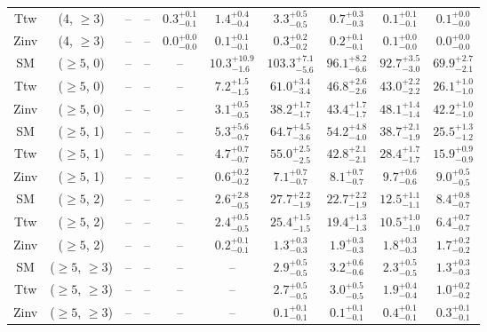 \begin{table}[h!]
{\begin{tabular}{cccccccccc}
	Ttw & (4, $\ge3$) & -- & -- & $0.3^{+ 0.1 }_{- 0.1 }$ & $1.4^{+ 0.4 }_{- 0.4 }$ & $3.3^{+ 0.5 }_{- 0.5 }$ & $0.7^{+ 0.3 }_{- 0.3 }$ & $0.1^{+ 0.1 }_{- 0.1 }$ & $0.1^{+ 0.0 }_{- 0.0 }$ \\[0.5ex] 
	Zinv & (4, $\ge3$) & -- & -- & $0.0^{+ 0.0 }_{- 0.0 }$ & $0.1^{+ 0.1 }_{- 0.1 }$ & $0.3^{+ 0.2 }_{- 0.2 }$ & $0.2^{+ 0.1 }_{- 0.1 }$ & $0.1^{+ 0.0 }_{- 0.0 }$ & $0.0^{+ 0.0 }_{- 0.0 }$ \\[0.5ex] 
	SM & ($\ge5$, 0) & -- & -- & -- & $10.3^{+ 10.9 }_{- 1.6 }$ & $103.3^{+ 7.1 }_{- 5.6 }$ & $96.1^{+ 8.2 }_{- 6.6 }$ & $92.7^{+ 3.5 }_{- 3.0 }$ & $69.9^{+ 2.7 }_{- 2.1 }$ \\[0.5ex] 
	Ttw & ($\ge5$, 0) & -- & -- & -- & $7.2^{+ 1.5 }_{- 1.5 }$ & $61.0^{+ 3.4 }_{- 3.4 }$ & $46.8^{+ 2.6 }_{- 2.6 }$ & $43.0^{+ 2.2 }_{- 2.2 }$ & $26.1^{+ 1.0 }_{- 1.0 }$ \\[0.5ex] 
	Zinv & ($\ge5$, 0) & -- & -- & -- & $3.1^{+ 0.5 }_{- 0.5 }$ & $38.2^{+ 1.7 }_{- 1.7 }$ & $43.4^{+ 1.7 }_{- 1.7 }$ & $48.1^{+ 1.4 }_{- 1.4 }$ & $42.2^{+ 1.0 }_{- 1.0 }$ \\[0.5ex] 
	SM & ($\ge5$, 1) & -- & -- & -- & $5.3^{+ 5.6 }_{- 0.7 }$ & $64.7^{+ 4.5 }_{- 3.6 }$ & $54.2^{+ 4.8 }_{- 4.0 }$ & $38.7^{+ 2.1 }_{- 1.9 }$ & $25.5^{+ 1.3 }_{- 1.2 }$ \\[0.5ex] 
	Ttw & ($\ge5$, 1) & -- & -- & -- & $4.7^{+ 0.7 }_{- 0.7 }$ & $55.0^{+ 2.5 }_{- 2.5 }$ & $42.8^{+ 2.1 }_{- 2.1 }$ & $28.4^{+ 1.7 }_{- 1.7 }$ & $15.9^{+ 0.9 }_{- 0.9 }$ \\[0.5ex] 
	Zinv & ($\ge5$, 1) & -- & -- & -- & $0.6^{+ 0.2 }_{- 0.2 }$ & $7.1^{+ 0.7 }_{- 0.7 }$ & $8.1^{+ 0.7 }_{- 0.7 }$ & $9.7^{+ 0.6 }_{- 0.6 }$ & $9.0^{+ 0.5 }_{- 0.5 }$ \\[0.5ex] 
	SM & ($\ge5$, 2) & -- & -- & -- & $2.6^{+ 2.8 }_{- 0.5 }$ & $27.7^{+ 2.2 }_{- 1.9 }$ & $22.7^{+ 2.2 }_{- 1.9 }$ & $12.5^{+ 1.1 }_{- 1.1 }$ & $8.4^{+ 0.8 }_{- 0.7 }$ \\[0.5ex] 
	Ttw & ($\ge5$, 2) & -- & -- & -- & $2.4^{+ 0.5 }_{- 0.5 }$ & $25.4^{+ 1.5 }_{- 1.5 }$ & $19.4^{+ 1.3 }_{- 1.3 }$ & $10.5^{+ 1.0 }_{- 1.0 }$ & $6.4^{+ 0.7 }_{- 0.7 }$ \\[0.5ex] 
	Zinv & ($\ge5$, 2) & -- & -- & -- & $0.2^{+ 0.1 }_{- 0.1 }$ & $1.3^{+ 0.3 }_{- 0.3 }$ & $1.9^{+ 0.3 }_{- 0.3 }$ & $1.8^{+ 0.3 }_{- 0.3 }$ & $1.7^{+ 0.2 }_{- 0.2 }$ \\[0.5ex] 
	SM & ($\ge5$, $\ge3$) & -- & -- & -- & -- & $2.9^{+ 0.5 }_{- 0.5 }$ & $3.2^{+ 0.6 }_{- 0.6 }$ & $2.3^{+ 0.5 }_{- 0.5 }$ & $1.3^{+ 0.3 }_{- 0.3 }$ \\[0.5ex] 
	Ttw & ($\ge5$, $\ge3$) & -- & -- & -- & -- & $2.7^{+ 0.5 }_{- 0.5 }$ & $3.0^{+ 0.5 }_{- 0.5 }$ & $1.9^{+ 0.4 }_{- 0.4 }$ & $1.0^{+ 0.2 }_{- 0.2 }$ \\[0.5ex] 
	Zinv & ($\ge5$, $\ge3$) & -- & -- & -- & -- & $0.1^{+ 0.1 }_{- 0.1 }$ & $0.1^{+ 0.1 }_{- 0.1 }$ & $0.4^{+ 0.1 }_{- 0.1 }$ & $0.3^{+ 0.1 }_{- 0.1 }$ \\[0.5ex] 
	\hline
	\hline
\end{tabular}}
\end{table}

